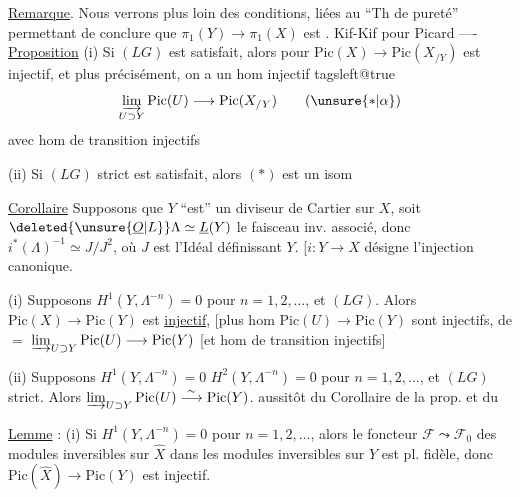 \uline{Remarque}. Nous verrons plus loin des conditions, liées au ``Th de pureté'' permettant de conclure que $\pi_1(Y)\longrightarrow\pi_1(X)$ est . Kif-Kif pour Picard ----
\uline{Proposition} (i) Si $(LG)$ est satisfait, alors pour  $\mathrm{Pic}(X)\longrightarrow\mathrm{Pic}(X_{/Y})$ est injectif,  et plus précisément, on a un hom injectif
{\csname tagsleft@true\endcsname
\[
\varinjlim_{U\supset Y}\mathrm{Pic}(U)\longrightarrow\mathrm{Pic}(X_{/Y}) \tag*{(\ensuremath{\unsure{*|\alpha}})}
\]
}
avec hom de transition injectifs

(ii) Si $(LG)$ strict est satisfait, alors $(*)$ est un isom

\uline{Corollaire} Supposons que $Y$ ``est'' un diviseur de Cartier sur $X$, soit $\deleted{\unsure{\underline O|L}}\Lambda\simeq\underline L(Y)$ le faisceau inv. associé, donc $i^*(\Lambda)^{-1}\simeq J/J^2$, où $J$ est l'Idéal définissant $Y$. [$i:Y\longrightarrow X$ désigne l'injection canonique.


(i) Supposons $H^1(Y,\Lambda^{-n})=0$ pour $n=1,2,\ldots$, et $(LG)$. Alors $\mathrm{Pic}(X)\longrightarrow\mathrm{Pic}(Y)$ est \uline{injectif}, [plus     hom $\mathrm{Pic}(U)\longrightarrow\mathrm{Pic}(Y)$ sont injectifs,  de $=$ $\varinjlim_{U\supset Y}\mathrm{Pic}(U)\longrightarrow\mathrm{Pic}(Y)$ [et hom de transition injectifs]

(ii) Supposons $H^1(Y,\Lambda^{-n})=0$  $H^2(Y,\Lambda^{-n})=0$ pour $n=1,2,\ldots$, et $(LG)$ strict. Alors $\varinjlim_{U\supset Y}\mathrm{Pic}(U)\overset{\sim}{\longrightarrow}\mathrm{Pic}(Y)$.
  aussitôt du   Corollaire de la prop. et du

\uline{Lemme} :  (i) Si $H^1(Y,\Lambda^{-n})=0$ pour $n=1,2,\ldots$, alors  le foncteur $\mathcal F\leadsto \mathcal F_0$ des modules  inversibles sur $\hat X$ dans les modules inversibles sur $Y$ est pl. fidèle,  donc $\mathrm{Pic}(\hat X)\longrightarrow\mathrm{Pic}(Y)$ est injectif.

